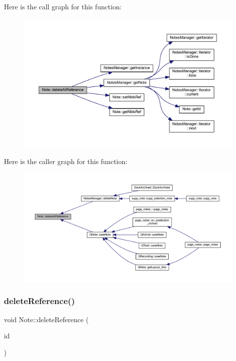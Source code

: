 Here is the call graph for this function\+:\nopagebreak
\begin{figure}[H]
\begin{center}
\leavevmode
\includegraphics[width=350pt]{class_note_aacbb89b120107a4b25dd16043908c693_cgraph}
\end{center}
\end{figure}
Here is the caller graph for this function\+:\nopagebreak
\begin{figure}[H]
\begin{center}
\leavevmode
\includegraphics[width=350pt]{class_note_aacbb89b120107a4b25dd16043908c693_icgraph}
\end{center}
\end{figure}
\mbox{\label{class_note_a91c86cf6ed18e4badb59a41e737a15fa}} 
\subsubsection{\texorpdfstring{delete\+Reference()}{deleteReference()}}
{\footnotesize\ttfamily void Note\+::delete\+Reference (\begin{DoxyParamCaption}\item[{const Q\+String \&}]{id }\end{DoxyParamCaption})}



